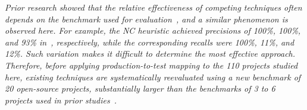 \emph{Prior research showed that the relative effectiveness of competing techniques often depends on the benchmark used for evaluation~\cite{lee2018bench4bl,chowdhury2024method}, and a similar phenomenon is observed here. For example, the NC heuristic achieved precisions of 100\%, 100\%, and 93\% in~\cite{van_rompaey_establishing_2009,white_tctracer_2022,sun_method-level_2024}, respectively, while the corresponding recalls were 100\%, 11\%, and 12\%. Such variation makes it difficult to determine the most effective approach. Therefore, before applying production-to-test mapping to the 110 projects studied here, existing techniques are systematically reevaluated using a new benchmark of 20 open-source projects, substantially larger than the benchmarks of 3 to 6 projects used in prior studies~\cite{white_establishing_2020,white_tctracer_2022,sun_method-level_2024}.}


